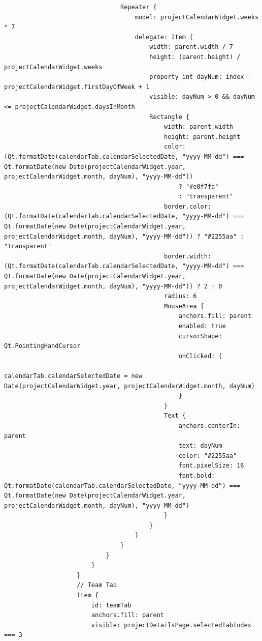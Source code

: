 \documentclass{report}
\begin{document}
\begin{lstlisting}
                                Repeater {
                                    model: projectCalendarWidget.weeks * 7
                                    delegate: Item {
                                        width: parent.width / 7
                                        height: (parent.height) / projectCalendarWidget.weeks
                                        property int dayNum: index - projectCalendarWidget.firstDayOfWeek + 1
                                        visible: dayNum > 0 && dayNum <= projectCalendarWidget.daysInMonth
                                        Rectangle {
                                            width: parent.width
                                            height: parent.height
                                            color: (Qt.formatDate(calendarTab.calendarSelectedDate, "yyyy-MM-dd") === Qt.formatDate(new Date(projectCalendarWidget.year, projectCalendarWidget.month, dayNum), "yyyy-MM-dd"))
                                                ? "#e0f7fa"
                                                : "transparent"
                                            border.color: (Qt.formatDate(calendarTab.calendarSelectedDate, "yyyy-MM-dd") === Qt.formatDate(new Date(projectCalendarWidget.year, projectCalendarWidget.month, dayNum), "yyyy-MM-dd")) ? "#2255aa" : "transparent"
                                            border.width: (Qt.formatDate(calendarTab.calendarSelectedDate, "yyyy-MM-dd") === Qt.formatDate(new Date(projectCalendarWidget.year, projectCalendarWidget.month, dayNum), "yyyy-MM-dd")) ? 2 : 0
                                            radius: 6
                                            MouseArea {
                                                anchors.fill: parent
                                                enabled: true
                                                cursorShape: Qt.PointingHandCursor
                                                onClicked: {
                                                    calendarTab.calendarSelectedDate = new Date(projectCalendarWidget.year, projectCalendarWidget.month, dayNum)
                                                }
                                            }
                                            Text {
                                                anchors.centerIn: parent
                                                text: dayNum
                                                color: "#2255aa"
                                                font.pixelSize: 16
                                                font.bold: Qt.formatDate(calendarTab.calendarSelectedDate, "yyyy-MM-dd") === Qt.formatDate(new Date(projectCalendarWidget.year, projectCalendarWidget.month, dayNum), "yyyy-MM-dd")
                                            }
                                        }
                                    }
                                }
                            }
                        }
                    }
                    // Team Tab
                    Item {
                        id: teamTab
                        anchors.fill: parent
                        visible: projectDetailsPage.selectedTabIndex === 3


\end{lstlisting}
\end{document}
